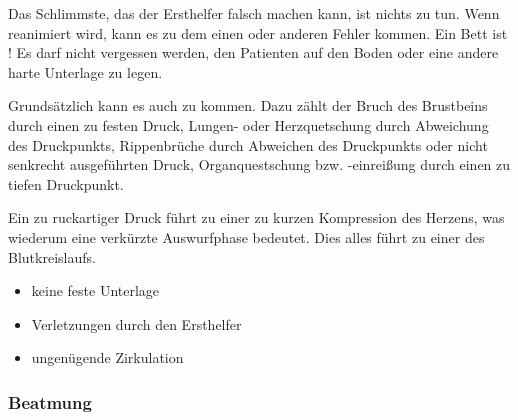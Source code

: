 {
Das Schlimmste, das der Ersthelfer falsch machen kann, ist
 nichts zu tun. Wenn reanimiert wird, kann es zu dem
 einen oder anderen Fehler kommen. Ein Bett ist ! Es darf nicht vergessen werden, den
 Patienten auf den Boden oder eine andere harte Unterlage zu
 legen.

Grundsätzlich
kann es auch zu  kommen. Dazu zählt der
Bruch des Brustbeins durch einen zu festen Druck, Lungen- oder Herzquetschung
durch Abweichung des Druckpunkts, Rippenbrüche durch Abweichen des
Druckpunkts oder nicht senkrecht ausgeführten Druck, Organquestschung bzw.
-einreißung durch einen zu tiefen Druckpunkt.  

Ein zu ruckartiger Druck führt zu einer zu kurzen Kompression des Herzens, was
wiederum eine verkürzte Auswurfphase bedeutet. Dies alles führt zu einer
 des Blutkreislaufs. 

}{
\begin{itemize}
    \item keine feste Unterlage
    \item Verletzungen durch den Ersthelfer
    \item ungenügende Zirkulation
\end{itemize}
}{}{}{}

\subsubsection{Beatmung}

